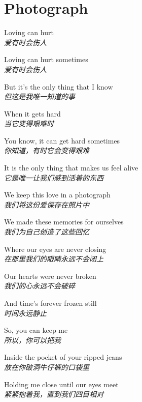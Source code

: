 \section{Photograph}

\thispagestyle{empty}


\begin{spacing}{1.5}
\begin{flushleft}
Loving can hurt\\
\textit{爱有时会伤人}\lyricspace

Loving can hurt sometimes\\
\textit{爱有时会伤人}\lyricspace

But it's the only thing that I know\\
\textit{但这是我唯一知道的事}\lyricspace

When it gets hard\\
\textit{当它变得艰难时}\lyricspace

You know, it can get hard sometimes\\
\textit{你知道，有时它会变得艰难}\lyricspace

It is the only thing that makes us feel alive\\
\textit{它是唯一让我们感到活着的东西}\lyricspace

We keep this love in a photograph\\
\textit{我们将这份爱保存在照片中}\lyricspace

We made these memories for ourselves\\
\textit{我们为自己创造了这些回忆}\lyricspace

Where our eyes are never closing\\
\textit{在那里我们的眼睛永远不会闭上}\lyricspace

Our hearts were never broken\\
\textit{我们的心永远不会破碎}\lyricspace

And time's forever frozen still\\
\textit{时间永远静止}\lyricspace

So, you can keep me\\
\textit{所以，你可以把我}\lyricspace

Inside the pocket of your ripped jeans\\
\textit{放在你破洞牛仔裤的口袋里}\lyricspace

Holding me close until our eyes meet\\
\textit{紧紧抱着我，直到我们四目相对}\lyricspace


\end{flushleft}
\end{spacing}
